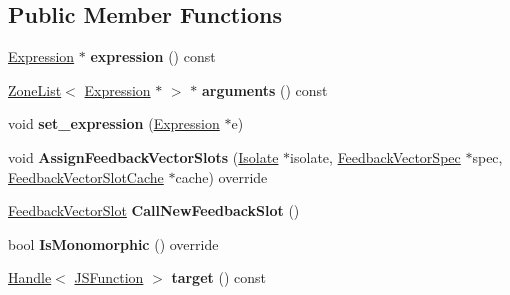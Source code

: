 \subsection*{Public Member Functions}
\begin{DoxyCompactItemize}
\item 
\hyperlink{classv8_1_1internal_1_1_expression}{Expression} $\ast$ {\bfseries expression} () const \hypertarget{classv8_1_1internal_1_1_call_new_a07b7e56d2677f5b5faa78bc96f526055}{}\label{classv8_1_1internal_1_1_call_new_a07b7e56d2677f5b5faa78bc96f526055}

\item 
\hyperlink{classv8_1_1internal_1_1_zone_list}{Zone\+List}$<$ \hyperlink{classv8_1_1internal_1_1_expression}{Expression} $\ast$ $>$ $\ast$ {\bfseries arguments} () const \hypertarget{classv8_1_1internal_1_1_call_new_aa8835fe1dc90807868e43b681c2ab450}{}\label{classv8_1_1internal_1_1_call_new_aa8835fe1dc90807868e43b681c2ab450}

\item 
void {\bfseries set\+\_\+expression} (\hyperlink{classv8_1_1internal_1_1_expression}{Expression} $\ast$e)\hypertarget{classv8_1_1internal_1_1_call_new_a1905ee0db4b6583bd610c744d78d49b1}{}\label{classv8_1_1internal_1_1_call_new_a1905ee0db4b6583bd610c744d78d49b1}

\item 
void {\bfseries Assign\+Feedback\+Vector\+Slots} (\hyperlink{classv8_1_1internal_1_1_isolate}{Isolate} $\ast$isolate, \hyperlink{classv8_1_1internal_1_1_feedback_vector_spec}{Feedback\+Vector\+Spec} $\ast$spec, \hyperlink{classv8_1_1internal_1_1_feedback_vector_slot_cache}{Feedback\+Vector\+Slot\+Cache} $\ast$cache) override\hypertarget{classv8_1_1internal_1_1_call_new_a0b9a6030ce167b7904df65bd352b11aa}{}\label{classv8_1_1internal_1_1_call_new_a0b9a6030ce167b7904df65bd352b11aa}

\item 
\hyperlink{classv8_1_1internal_1_1_feedback_vector_slot}{Feedback\+Vector\+Slot} {\bfseries Call\+New\+Feedback\+Slot} ()\hypertarget{classv8_1_1internal_1_1_call_new_ad04bb263474a59ed401d202a544a48a6}{}\label{classv8_1_1internal_1_1_call_new_ad04bb263474a59ed401d202a544a48a6}

\item 
bool {\bfseries Is\+Monomorphic} () override\hypertarget{classv8_1_1internal_1_1_call_new_a9a74f3e0602e3b0566ed0b12265c1fd6}{}\label{classv8_1_1internal_1_1_call_new_a9a74f3e0602e3b0566ed0b12265c1fd6}

\item 
\hyperlink{classv8_1_1internal_1_1_handle}{Handle}$<$ \hyperlink{classv8_1_1internal_1_1_j_s_function}{J\+S\+Function} $>$ {\bfseries target} () const \hypertarget{classv8_1_1internal_1_1_call_new_a805ff1c694beb81e234fae3af41ba550}{}\label{classv8_1_1internal_1_1_call_new_a805ff1c694beb81e234fae3af41ba550}


\end{DoxyCompactItemize}
